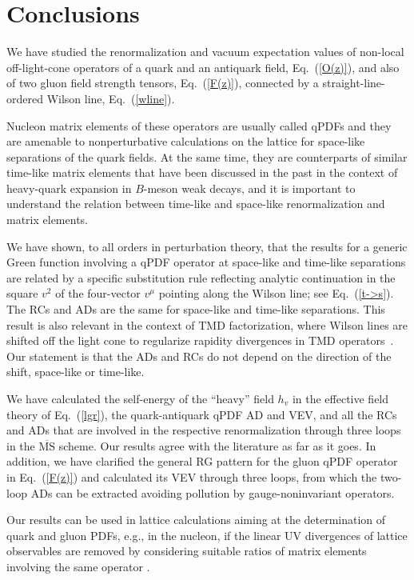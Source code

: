 \documentclass[12pt]{article}
\numberwithin{equation}{section}
\newcommand{\1}[1]{\mathbf{1}^{#1}}
\newcommand{\2}[1]{\mathbf{2}^{#1}}
\newcommand{\3}[1]{\mathbf{3}^{#1}}
\newcommand{\4}[1]{\mathbf{4}^{#1}}
\newcommand{\5}[1]{\mathbf{5}^{#1}}
\newcommand{\vv}{v^2}
\begin{document}
\section{Conclusions}
\label{sec:six}

We have studied the renormalization and vacuum expectation values of 
non-local off-light-cone operators of a quark and an antiquark field, Eq.~(\ref{O(z)}), and also of two gluon field strength tensors,
Eq.~(\ref{F(z)}), connected by a straight-line-ordered Wilson line, Eq.~(\ref{wline}).

Nucleon matrix elements of these operators are usually called qPDFs and they
are amenable to nonperturbative calculations on the lattice for
space-like separations of the quark fields.   
At the same time, they are counterparts of similar time-like matrix elements that have been 
discussed in the past in the context of heavy-quark expansion in $B$-meson weak decays,
and it is important to understand the relation between time-like and space-like renormalization and matrix elements.

We have shown, to all orders in perturbation theory, that the results for a generic Green function involving a qPDF operator 
at space-like and time-like separations are related by a
specific substitution rule reflecting analytic continuation in the square $\vv$
of the four-vector $v^\mu$ pointing along the Wilson line; see Eq.~(\ref{t->s}).
The RCs and ADs are the same for space-like and time-like separations.
This result is also relevant in the context of
TMD factorization, where Wilson lines are shifted off the light cone to      
regularize rapidity divergences in TMD operators~\cite{Collins:2011zzd}. Our statement is that
the ADs and RCs do not depend on the direction of the shift, space-like or time-like. 

We have calculated the self-energy of the ``heavy'' field $h_v$ in the effective field theory of Eq.~(\ref{lgr}), 
the quark-antiquark qPDF AD and VEV,  
and all the RCs and ADs that are involved in the respective renormalization
through three loops in the $\overline{\mbox{MS}}$ scheme.  Our results
agree with the literature as far as it goes.  
In addition, we have clarified the general RG pattern for the gluon qPDF operator in Eq.~(\ref{F(z)})
and calculated its VEV through three loops, from which the two-loop ADs can be extracted avoiding pollution by gauge-noninvariant operators.

Our results can be used in lattice calculations aiming at the determination of quark and gluon PDFs, e.g., in the nucleon, if the linear UV divergences of lattice observables are removed by considering suitable ratios of matrix
elements involving the same operator \cite{Orginos:2017kos,Braun:2018brg}.
\end{document}
